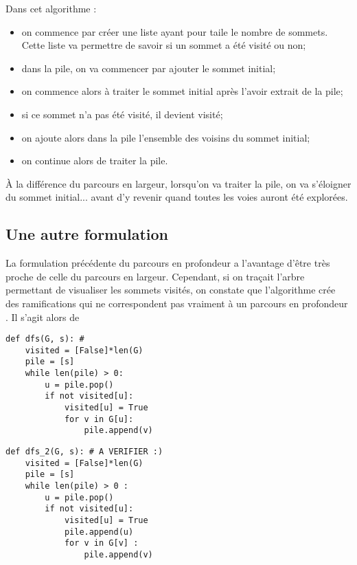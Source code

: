 Dans cet algorithme : 
\begin{itemize}
\item on commence par créer une liste ayant pour taile le nombre de sommets. Cette liste va permettre de savoir si un sommet a été visité ou non;
\item dans la pile, on va commencer par ajouter le sommet initial;
\item on commence alors à traiter le sommet initial après l'avoir extrait de la pile;
\item si ce sommet n'a pas été visité, il devient visité;
\item on ajoute alors dans la pile l'ensemble des voisins du sommet initial;
\item on continue alors de traiter la pile. 
\end{itemize}
À la différence du parcours en largeur, lorsqu'on va traiter la pile, on va s'éloigner du sommet initial... avant d'y revenir quand toutes les voies auront été explorées. 

\subsection{Une autre formulation}
La formulation précédente du parcours en profondeur a l'avantage d'être très proche de celle du parcours en largeur. Cependant, si on traçait l'arbre permettant de visualiser les sommets visités, on constate que l'algorithme crée des ramifications qui ne correspondent pas vraiment à un parcours en profondeur . 
Il s'agit alors de 

\begin{minipage}[c]{.45\linewidth}
\begin{lstlisting}
def dfs(G, s): #
    visited = [False]*len(G)
    pile = [s]
    while len(pile) > 0:
        u = pile.pop()
        if not visited[u]:
            visited[u] = True
            for v in G[u]:
                pile.append(v)
\end{lstlisting}
\end{minipage}
\hfill
\begin{minipage}[c]{.45\linewidth}
\begin{lstlisting}
def dfs_2(G, s): # A VERIFIER :)
    visited = [False]*len(G)
    pile = [s]
    while len(pile) > 0 :
        u = pile.pop()
        if not visited[u]:
            visited[u] = True
            pile.append(u)
            for v in G[v] :
                pile.append(v)
\end{lstlisting}
\end{minipage}

